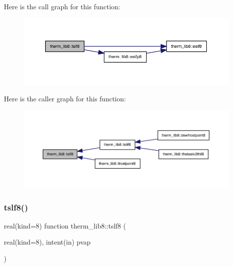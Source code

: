 Here is the call graph for this function\+:
\nopagebreak
\begin{figure}[H]
\begin{center}
\leavevmode
\includegraphics[width=350pt]{namespacetherm__lib8_a80b5a2ebc2ce135a214004173c06cb4e_cgraph}
\end{center}
\end{figure}
Here is the caller graph for this function\+:
\nopagebreak
\begin{figure}[H]
\begin{center}
\leavevmode
\includegraphics[width=350pt]{namespacetherm__lib8_a80b5a2ebc2ce135a214004173c06cb4e_icgraph}
\end{center}
\end{figure}
\mbox{\label{namespacetherm__lib8_ad5b9924474672841007e9b1542a87b4e}} 
\subsubsection{\texorpdfstring{tslf8()}{tslf8()}}
{\footnotesize\ttfamily real(kind=8) function therm\+\_\+lib8\+::tslf8 (\begin{DoxyParamCaption}\item[{real(kind=8), intent(in)}]{pvap }\end{DoxyParamCaption})}

